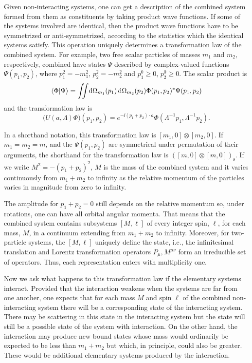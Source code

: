 Given non-interacting systems, one can get a description of the combined system
formed from them as constituents by taking product wave functions. If some of
the systems involved are identical, then the product wave functions have to be
symmetrized or anti-symmetrized, according to the statistics which the identical
systems satisfy. This operation uniquely determines a transformation law of the
combined system. For example, two free scalar particles of masses $m_1$ and
$m_2$, respectively, combined have states $\Psi$ described by complex-valued
functions $\Psi(p_1,p_2)$, where $p_1^2=-m_1^2$, $p_2^2=-m_2^2$ and
$p_1^0\geq0$, $p_2^0\geq0$. The scalar product is
\begin{equation*}
  \langle \Phi\vert \Psi\rangle=\iint\!\mathop{}\!\mathrm{d}\Omega_{m_1}(p_1)\mathop{}\!\mathrm{d}\Omega_{m_2}(p_2)
  \Phi(p_1,p_2)^*\Psi(p_1,p_2)
\end{equation*}
and the transformation law is
\begin{equation*}
  \bigl(U(a,\Lambda)\Phi\bigr)(p_1,p_2)
  =e^{-\ii(p_1+p_2)\cdot a}
    \Phi(\Lambda^{-1}p_1,\Lambda^{-1}p_2).
\end{equation*}

In a shorthand notation, this transformation law is
$[m_1,0]\otimes[m_2,0]$. If $m_1=m_2=m$, and the $\Psi(p_1,p_2)$ are
symmetrical under permutation of their arguments, the shorthand for the
transformation law is $([m,0]\otimes[m,0])_{\mathrm{s}}$. If we write
$M^2=-(p_1+p_2)^2$, $M$ is the mass of the combined system and it varies
continuously from $m_1+m_2$ to infinity as the relative momentum of the
particles varies in magnitude from zero to infinity.

The amplitude for $p_1+p_2=0$ still depends on the relative momentum so, under
rotations, one can have all orbital angular momenta. That means that the
combined system contains subsystems $[M,\ell]$ of every integer spin, $\ell$,
for each mass, $M$, in a continuum extending from $m_1+m_2$ to infinity.
Moreover, for two-particle systems, the $[M,\ell]$ uniquely define the state,
i.e., the infinitesimal translation and Lorentz transformation operators
$P_\mu,M^{\mu\nu}$ form an irreducible set of operators. Thus, each
representation enters with multiplicity one.

Now we ask what happens to this transformation law if the elementary systems
interact. Provided that the interaction weakens when the systems are far from
one another, one expects that for each mass $M$ and spin $\ell$ of the combined
non-interacting system there will be a corresponding state of the interacting
system. There may be scattering in this state in the interacting system but the
state will still be a possible state of the system with interaction. On the other
hand, the interaction may produce new bound states whose mass would ordinarily
be expected to be less than $m_1+m_2$ but which, in principle, could also be
greater. These would be additional elementary systems produced by the
interaction.

